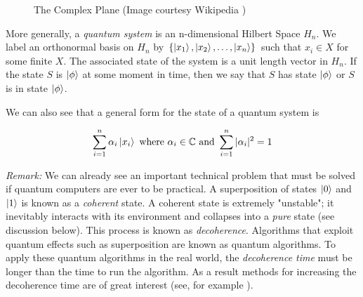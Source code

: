 \documentclass[11pt, oneside]{article}   	%
\begin{document}
\begin{figure}
\caption{The Complex Plane (Image courtesy Wikipedia \cite{wiki:complex_plane})}
\label{fig:complex_plane_wiki}
\end{figure}

\bigskip
\noindent
More generally, a \emph{quantum system} is an n-dimensional Hilbert Space $H_n$. We label an orthonormal basis on $H_n$
 by $\{\ket{x_1}, \ket{x_2}, \hdots, \ket{x_n}\}$ such that $x_i \in X$ for some finite $X$. The associated state of the system is a 
 unit length vector in $H_n$. If the state $S$ is  $\ket{\phi}$ at some moment in time, then we say that $S$ has state  $\ket{\phi}$
 or $S$ is in state  $\ket{\phi}$.
 
 \bigskip
 \noindent
 We can also see that a general form for the state of a quantum system is
 
 \begin{equation*}
 \sum\limits_{i = 1}^n \alpha_i \ket{x_i} \text{ where } \alpha_i \in \mathbb{C} \text{ and } \sum\limits_{i = 1}^n |\alpha_i|^2 = 1
 \end{equation*}

\bigskip
\noindent
\emph{Remark:}  We can already see an important technical problem that must be solved if quantum computers are ever to be practical. A superposition of states $\ket{0}$ and $\ket{1}$ is known 
as a \emph{coherent} state. A coherent state is extremely "unstable"; it inevitably interacts with its environment and collapses into a \emph{pure} state (see discussion below). This process is known as 
\emph{decoherence}. Algorithms that exploit quantum effects such as superposition are known as quantum algorithms. To apply 
these quantum algorithms in the real world, the \emph{decoherence time} must be longer than the time to run the algorithm. As a result methods for increasing the decoherence time 
are of great interest (see, for example \cite{2018PNAS..11510938L}).
\end{document}
